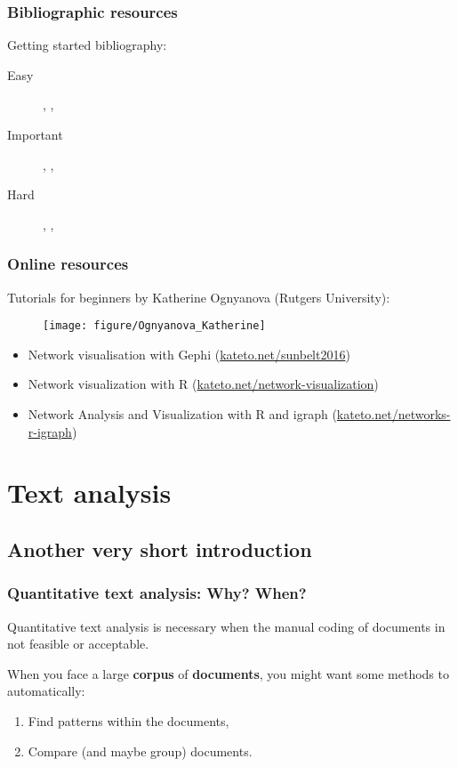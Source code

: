 \documentclass[serif, aspectratio=169]{beamer}
\newcommand{\customcite}[1]{\citeauthor{#1}, \citetitle{#1}, \citeyear{#1}}
\begin{document}
\begin{frame}
\frametitle{Bibliographic resources}

Getting started bibliography:

\begin{description}
\item [Easy] \customcite{scott_what_2012}
\item [Important] \customcite{marin_social_2011}
\item [Hard] \customcite{newman_networks_2010}
\end{description}

\end{frame}


\begin{frame}
\frametitle{Online resources}

Tutorials for beginners by Katherine Ognyanova (Rutgers University):

\begin{figure}
    \centering
    \texttt{[image: figure/Ognyanova\_Katherine]}
\end{figure}


\begin{itemize}
\item Network visualisation with Gephi (\url{kateto.net/sunbelt2016})
\item Network visualization with R (\url{kateto.net/network-visualization})
\item Network Analysis and Visualization with R and igraph (\url{kateto.net/networks-r-igraph})
\end{itemize}

\end{frame}

\iffalse

\section{Text analysis}

\subsection{Another very short introduction}

\begin{frame}
\frametitle{Quantitative text analysis: Why? When?}

Quantitative text analysis is necessary when the manual coding of documents in not feasible or acceptable. 

When you face a large \textbf{corpus} of \textbf{documents}, you might want some methods to automatically:

\begin{enumerate}

\item Find patterns within the documents,

\item Compare (and maybe group) documents.

\end{enumerate}

\end{frame}
\end{document}
